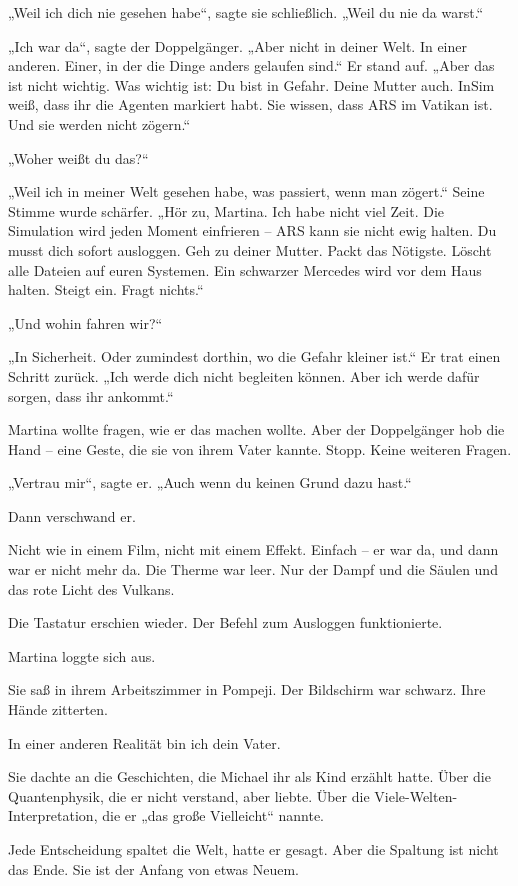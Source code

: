 \documentclass[
]{article}
\begin{document}
„Weil ich dich nie gesehen habe``, sagte sie schließlich. „Weil du nie da warst.``

„Ich war da``, sagte der Doppelgänger. „Aber nicht in deiner Welt. In einer anderen. Einer, in der die Dinge anders gelaufen sind.`` Er stand auf. „Aber das ist nicht wichtig. Was wichtig ist: Du bist in Gefahr. Deine Mutter auch. InSim weiß, dass ihr die Agenten markiert habt. Sie wissen, dass ARS im Vatikan ist. Und sie werden nicht zögern.``

„Woher weißt du das?{\kern0pt}``

„Weil ich in meiner Welt gesehen habe, was passiert, wenn man zögert.`` Seine Stimme wurde schärfer. „Hör zu, Martina. Ich habe nicht viel Zeit. Die Simulation wird jeden Moment einfrieren -- ARS kann sie nicht ewig halten. Du musst dich sofort ausloggen. Geh zu deiner Mutter. Packt das Nötigste. Löscht alle Dateien auf euren Systemen. Ein schwarzer Mercedes wird vor dem Haus halten. Steigt ein. Fragt nichts.``

„Und wohin fahren wir?{\kern0pt}``

„In Sicherheit. Oder zumindest dorthin, wo die Gefahr kleiner ist.`` Er trat einen Schritt zurück. „Ich werde dich nicht begleiten können. Aber ich werde dafür sorgen, dass ihr ankommt.``

Martina wollte fragen, wie er das machen wollte. Aber der Doppelgänger hob die Hand -- eine Geste, die sie von ihrem Vater kannte. Stopp. Keine weiteren Fragen.

„Vertrau mir``, sagte er. „Auch wenn du keinen Grund dazu hast.``

Dann verschwand er.

Nicht wie in einem Film, nicht mit einem Effekt. Einfach -- er war da, und dann war er nicht mehr da. Die Therme war leer. Nur der Dampf und die Säulen und das rote Licht des Vulkans.

Die Tastatur erschien wieder. Der Befehl zum Ausloggen funktionierte.

Martina loggte sich aus.

Sie saß in ihrem Arbeitszimmer in Pompeji. Der Bildschirm war schwarz. Ihre Hände zitterten.

In einer anderen Realität bin ich dein Vater.

Sie dachte an die Geschichten, die Michael ihr als Kind erzählt hatte. Über die Quantenphysik, die er nicht verstand, aber liebte. Über die Viele-Welten-Interpretation, die er „das große Vielleicht`` nannte.

Jede Entscheidung spaltet die Welt, hatte er gesagt. Aber die Spaltung ist nicht das Ende. Sie ist der Anfang von etwas Neuem.
\end{document}

